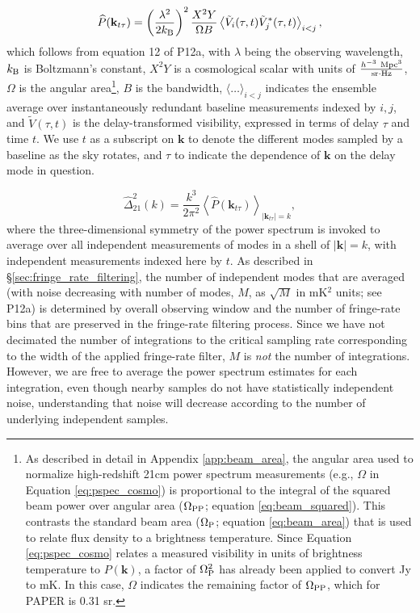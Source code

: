 \documentclass[twocolumn,apj,numberedappendix]{emulateapj}
\def\k{\mathbf{k}}
\begin{document}
\begin{equation}
\widehat P(\k_{t\tau}) = \left(\frac{\lambda^2}{2k_{\rm B}}\right)^2\frac{X^2Y}{\Omega B}
\left\langle{\tilde V_i(\tau,t) \tilde V_j^*(\tau,t)}\right\rangle_{i<j},
\label{eq:pspec_cosmo}
\end{equation}
which follows from equation 12 of P12a, with $\lambda$ being the observing
wavelength, $k_{\rm B}$ is Boltzmann's constant, $X^2Y$ is a cosmological scalar with units
of $\frac{h^{-3}\ {\rm Mpc}^3}{{\rm sr}\cdot {\rm Hz}}$, $\Omega$ is the angular 
area\footnote{
As described in detail in Appendix \ref{app:beam_area}, the angular area used to normalize
high-redshift 21cm power spectrum measurements (e.g., $\Omega$ in Equation \ref{eq:pspec_cosmo}) is proportional
to the integral of the squared beam power over angular area ($\Omega_{\rm PP}$; equation \ref{eq:beam_squared}).
This contrasts the standard beam area ($\Omega_{\rm P}$; equation \ref{eq:beam_area}) that is
used to relate flux density to a brightness temperature.
Since Equation \ref{eq:pspec_cosmo} 
relates a measured visibility in units of brightness
temperature to $P(\k)$, a factor of $\Omega_{\rm P}^2$ has already been
applied to convert Jy to mK.  In this case,
$\Omega$ indicates the remaining factor of $\Omega_{\rm PP}$, which for PAPER is 0.31 sr.},
$B$ is the bandwidth, $\langle\dots\rangle_{i<j}$ indicates the ensemble average
over instantaneously redundant baseline measurements indexed by $i,j$,
and $\tilde V(\tau,t)$ is the delay-transformed visibility,
expressed in terms of delay $\tau$ and time $t$.
We use $t$ as a subscript on $\k$
to denote the different modes sampled by a baseline as the sky rotates, and $\tau$ to indicate
the dependence of $\k$ on the delay mode in question.

\begin{equation}
\widehat \Delta^2_{21}(k) = \frac{k^3}{2\pi^2}\left\langle \widehat P(\k_{t\tau})\right\rangle_{|\k_{t\tau}|=k},
\end{equation}
where the three-dimensional symmetry of the power spectrum is invoked to average over
all independent measurements of modes in a shell of $|\k|=k$, with independent measurements
indexed here by $t$.  As described in \S\ref{sec:fringe_rate_filtering}, the number of independent modes
that are averaged (with noise decreasing with number of modes, $M$, as $\sqrt{M}$ in mK$^2$ units; see P12a) is 
determined
by overall observing window and the number of fringe-rate bins that are 
preserved in the fringe-rate filtering process.
Since we have not decimated the number of integrations to the critical sampling rate corresponding to the 
width of the applied fringe-rate filter, $M$ is {\it not} the number of integrations.  However,
we are free to average the power spectrum estimates for each integration, even though nearby samples
do not have statistically independent noise, understanding that noise will decrease according to the number
of underlying independent samples.
\end{document}
